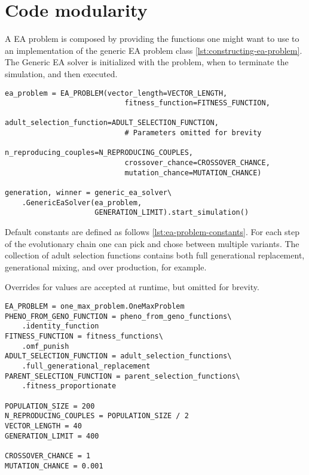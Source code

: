 \section{Code modularity}

A EA problem is composed by providing the functions one might want to use to an implementation of the generic EA problem class \ref{lst:constructing-ea-problem}. The Generic EA solver is initialized with the problem, when to terminate the simulation, and then executed.

\begin{lstlisting}[caption={constructing an ea problem}, label={lst:constructing-ea-problem}]
ea_problem = EA_PROBLEM(vector_length=VECTOR_LENGTH,
                            fitness_function=FITNESS_FUNCTION,
                            adult_selection_function=ADULT_SELECTION_FUNCTION,
                            # Parameters omitted for brevity
                            n_reproducing_couples=N_REPRODUCING_COUPLES,
                            crossover_chance=CROSSOVER_CHANCE,
                            mutation_chance=MUTATION_CHANCE)

generation, winner = generic_ea_solver\
    .GenericEaSolver(ea_problem,
                     GENERATION_LIMIT).start_simulation()

\end{lstlisting}

Default constants are defined as follows \ref{lst:ea-problem-constants}. For each step of the evolutionary chain one can pick and chose between multiple variants. The collection of adult selection functions contains both full generational replacement, generational mixing, and over production, for example.

Overrides for values are accepted at runtime, but omitted for brevity.

\begin{lstlisting}[caption={Initial values for the EA problem}, label={lst:ea-problem-constants}]
EA_PROBLEM = one_max_problem.OneMaxProblem
PHENO_FROM_GENO_FUNCTION = pheno_from_geno_functions\
	.identity_function
FITNESS_FUNCTION = fitness_functions\
	.omf_punish
ADULT_SELECTION_FUNCTION = adult_selection_functions\
	.full_generational_replacement
PARENT_SELECTION_FUNCTION = parent_selection_functions\
	.fitness_proportionate

POPULATION_SIZE = 200
N_REPRODUCING_COUPLES = POPULATION_SIZE / 2
VECTOR_LENGTH = 40
GENERATION_LIMIT = 400

CROSSOVER_CHANCE = 1
MUTATION_CHANCE = 0.001

\end{lstlisting}
